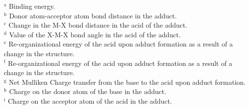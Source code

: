 $^{\mathrm{a}}$ Binding energy. \\
$^{\mathrm{b}}$ Donor atom-acceptor atom bond distance in the adduct.\\
$^{\mathrm{c}}$ Change in the M-X bond distance in the acid of the adduct.\\
$^{\mathrm{d}}$ Value of the X-M-X bond angle in the acid of the adduct.\\
$^{\mathrm{e}}$ Re-organizational energy of the acid upon adduct formation as a result of a change in the structure.\\
$^{\mathrm{f}}$ Re-organizational energy of the acid upon adduct formation as a result of a change in the structure.\\
$^{\mathrm{g}}$ Net Mulliken Charge transfer from the base to the acid upon adduct formation.\\
$^{\mathrm{h}}$ Charge on the donor atom of the base in the adduct.\\
$^{\mathrm{i}}$ Charge on the acceptor atom of the acid in the adduct.\\

